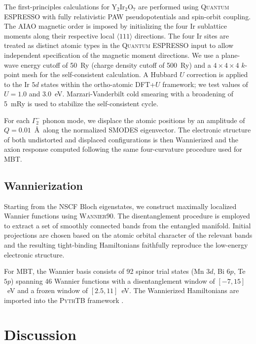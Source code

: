 \documentclass[galley,aps,pra,10pt,amsmath,amssymb,
    superscriptaddress,nofootinbib,longbibliography]{revtex4-2}
\def\Red#1{\textcolor{red}{#1}}
\newcounter{comm}
\newcommand{\seclab}[1]{\label{sec:#1}{\Red{\small\;\;[sec:~#1]}}}
\newcommand{\seclab}[1]{\label{sec:#1}}
\newcommand{\code}[1]{\textsc{#1}}
\begin{document}
The first-principles calculations for Y$_2$Ir$_2$O$_7$ are performed using \code{Quantum ESPRESSO} with fully relativistic PAW pseudopotentials and spin-orbit coupling.
The AIAO magnetic order is imposed by initializing the four Ir sublattice moments along their respective local $\langle 111 \rangle$ directions.
The four Ir sites are treated as distinct atomic types in the \code{Quantum ESPRESSO} input to allow independent specification of the magnetic moment directions.
We use a plane-wave energy cutoff of 50~Ry (charge density cutoff of 500~Ry) and a $4 \times 4 \times 4$ $k$-point mesh for the self-consistent calculation.
A Hubbard $U$ correction is applied to the Ir $5d$ states within the ortho-atomic DFT+$U$ framework; we test values of $U = 1.0$ and $3.0$~eV.
Marzari-Vanderbilt cold smearing with a broadening of 5~mRy is used to stabilize the self-consistent cycle.

For each $\Gamma_2^-$ phonon mode, we displace the atomic positions by an amplitude of $Q = 0.01$~\AA\ along the normalized \code{SMODES} eigenvector.
The electronic structure of both undistorted and displaced configurations is then Wannierized and the axion response computed following the same four-curvature procedure used for MBT.

\subsection{Wannierization}

Starting from the NSCF Bloch eigenstates, we construct maximally localized Wannier functions using \code{Wannier90}.
The disentanglement procedure is employed to extract a set of smoothly connected bands from the entangled manifold.
Initial projections are chosen based on the atomic orbital character of the relevant bands and the resulting tight-binding Hamiltonians faithfully reproduce the low-energy electronic structure.

For MBT, the Wannier basis consists of 92 spinor trial states (Mn $3d$, Bi $6p$, Te $5p$) spanning 46 Wannier functions with a disentanglement window of $[-7, 15]$~eV and a frozen window of $[2.5, 11]$~eV.
The Wannierized Hamiltonians are imported into the \code{PythTB} framework \cite{Cole_Python_Tight_Binding_2025}.





\section{Discussion}
\seclab{conclusions}




\end{document}
